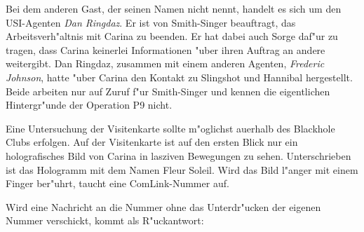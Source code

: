Bei dem anderen Gast, der seinen Namen nicht nennt, handelt es sich um den USI-Agenten \emph{Dan Ringdaz}. Er ist von Smith-Singer beauftragt, das Arbeitsverh"altnis mit Carina zu beenden. Er hat dabei auch Sorge daf"ur zu tragen, dass Carina keinerlei Informationen "uber ihren Auftrag an andere weitergibt. Dan Ringdaz, zusammen mit einem anderen Agenten, \emph{Frederic Johnson}, hatte "uber Carina den Kontakt zu Slingshot und Hannibal hergestellt. Beide arbeiten nur auf Zuruf f"ur Smith-Singer und kennen die eigentlichen Hintergr"unde der Operation P9 nicht.


Eine Untersuchung der Visitenkarte sollte m"oglichst au\3erhalb des Blackhole Clubs erfolgen. Auf der Visitenkarte ist auf den ersten Blick nur ein holografisches Bild von Carina in lasziven Bewegungen zu sehen. Unterschrieben ist das Hologramm mit dem Namen Fleur Soleil. Wird das Bild l"anger mit einem Finger ber"uhrt, taucht eine ComLink-Nummer auf.

Wird eine Nachricht an die Nummer ohne das Unterdr"ucken der eigenen Nummer verschickt, kommt als R"uckantwort: 

